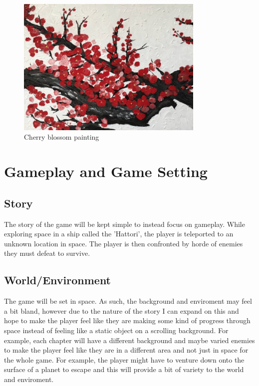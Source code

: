 \documentclass[a4paper]{scrreprt}
\begin{document}
  \begin{figure}[h]
    \centering
    \includegraphics[width=0.8\textwidth]{cherry}
    \caption{Cherry blossom painting}
    \end{figure}
\chapter{Gameplay and Game Setting}
\section{Story}
The story of the game will be kept simple to instead focus on gameplay. While exploring space in a ship called the 'Hattori', the player is teleported to an unknown location in space. The player is then confronted by horde of enemies they must defeat to survive.

\section{World/Environment}
The game will be set in space. As such, the background and enviroment may feel a bit bland, however due to the nature of the story I can expand on this and hope to make the player feel like they are making some kind of progress through space instead of feeling like a static object on a scrolling background. 
For example, each chapter will have a different background and maybe varied enemies to make the player feel like they are in a different area and not just in space for the whole game. For example, the player might have to venture down onto the surface of a planet to escape and this will provide a bit of variety to the world and enviroment.
\end{document}
